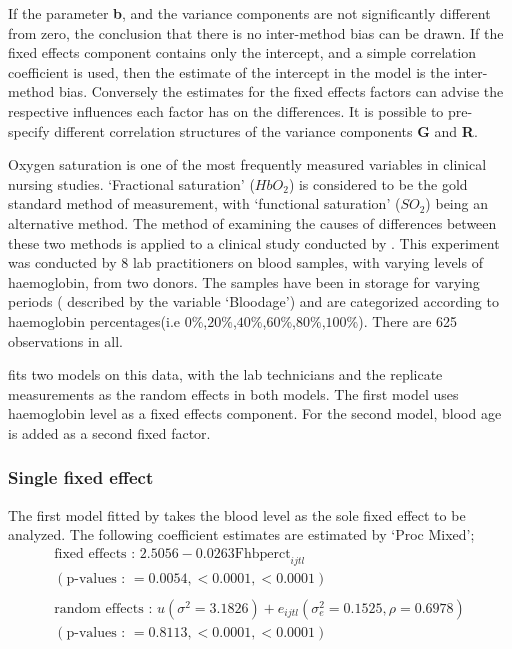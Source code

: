 \documentclass[12pt, a4paper]{report}
\theoremstyle{plain}
\theoremstyle{definition}
\theoremstyle{remark}
\begin{document}
	If the parameter \textbf{b}, and the variance components are not
	significantly different from zero, the conclusion that there is no
	inter-method bias can be drawn. If the fixed effects component
	contains only the intercept, and a simple correlation coefficient
	is used, then the estimate of the intercept in the model is the
	inter-method bias. Conversely the estimates for the fixed effects
	factors can advise the respective influences each factor has on
	the differences. It is possible to pre-specify different
	correlation structures of the variance components \textbf{G} and
	\textbf{R}.
	
	
	Oxygen saturation is one of the most frequently measured variables
	in clinical nursing studies. `Fractional saturation' ($HbO_{2}$)
	is considered to be the gold standard method of measurement, with
	`functional saturation' ($SO_{2}$) being an alternative method.
	The method of examining the causes of differences between these
	two methods is applied to a clinical study conducted by
	\citet{Shiao}. This experiment was conducted by 8 lab
	practitioners on blood samples, with varying levels of
	haemoglobin, from two donors. The samples have been in storage for
	varying periods ( described by the variable `Bloodage') and are
	categorized according to haemoglobin percentages(i.e
	$0\%$,$20\%$,$40\%$,$60\%$,$80\%$,$100\%$). There are 625
	observations in all.
	
	\citet{LaiShiao} fits two models on this data, with the lab
	technicians and the replicate measurements as the random effects
	in both models. The first model uses haemoglobin level as a fixed
	effects component. For the second model, blood age is added as a
	second fixed factor.
	
	\subsubsection{Single fixed effect} The first model fitted by \citet{LaiShiao} takes the
	blood level as the sole fixed effect to be analyzed. The following
	coefficient estimates are estimated by `Proc Mixed';
	\begin{eqnarray}
	\mbox{fixed effects :   } 2.5056 - 0.0263\mbox{Fhbperct}_{ijtl} \\
	(\mbox{p-values :   } = 0.0054, <0.0001, <0.0001)\nonumber\\\nonumber\\
	\mbox{random effects :   } u(\sigma^{2}=3.1826) + e_{ijtl}
	(\sigma^{2}_{e}=0.1525, \rho= 0.6978) \nonumber\\
	(\mbox{p-values :   } = 0.8113, <0.0001, <0.0001)\nonumber
	\end{eqnarray}
	
\end{document}
